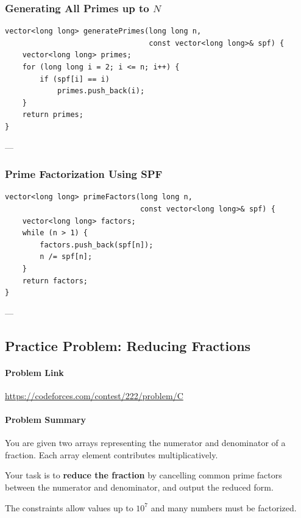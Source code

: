 \documentclass[11pt]{article}
\begin{document}
\subsubsection{Generating All Primes up to $N$}

\begin{lstlisting}
vector<long long> generatePrimes(long long n,
                                 const vector<long long>& spf) {
    vector<long long> primes;
    for (long long i = 2; i <= n; i++) {
        if (spf[i] == i)
            primes.push_back(i);
    }
    return primes;
}
\end{lstlisting}

---

\subsubsection{Prime Factorization Using SPF}

\begin{lstlisting}
vector<long long> primeFactors(long long n,
                               const vector<long long>& spf) {
    vector<long long> factors;
    while (n > 1) {
        factors.push_back(spf[n]);
        n /= spf[n];
    }
    return factors;
}
\end{lstlisting}

---
\subsection{Practice Problem: Reducing Fractions}

\paragraph{Problem Link}
\url{https://codeforces.com/contest/222/problem/C}

\paragraph{Problem Summary}

You are given two arrays representing the numerator and denominator of a fraction.
Each array element contributes multiplicatively.

Your task is to \textbf{reduce the fraction} by cancelling common prime factors
between the numerator and denominator, and output the reduced form.

The constraints allow values up to $10^7$ and many numbers must be factorized.
\end{document}
